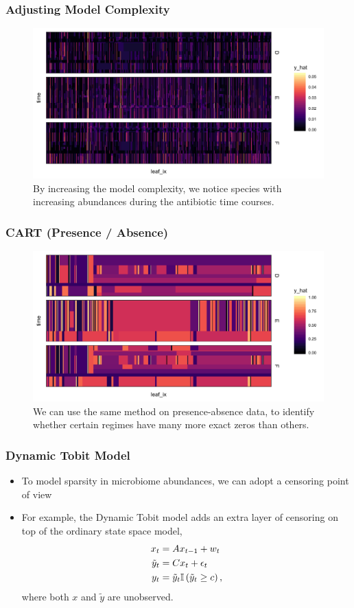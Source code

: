 \documentclass{beamer}
\begin{document}
\begin{frame}
  \frametitle{Adjusting Model Complexity}
  \begin{figure}[ht]
    \centering
    \includegraphics[width=.8\textwidth]{figure/rpart_simple}
    \caption{By increasing the model complexity, we notice species with
      increasing abundances during the antibiotic time
      courses. \label{fig:rpart_simple} }
  \end{figure}
\end{frame}


\begin{frame}
  \frametitle{CART (Presence / Absence)}
  \begin{figure}[ht]
    \centering
    \includegraphics[width=.8\textwidth]{figure/rpart_binary}
    \caption{We can use the same method on presence-absence data, to identify
      whether certain regimes have many more exact zeros than others.
      \label{fig:rpart_binary} }
  \end{figure}
\end{frame}


\begin{frame}
  \frametitle{Dynamic Tobit Model}
  \begin{itemize}
  \item To model sparsity in microbiome abundances, we can adopt a censoring
    point of view
  \item For example, the Dynamic Tobit model adds an extra layer of censoring on
    top of the ordinary state space model,
    \begin{align*}
      x_{t} &= Ax_{t - 1} + w_{t} \\
      \tilde{y}_{t} &= Cx_{t} + \epsilon_{t} \\
      y_{t} &= \tilde{y}_{t} \mathbb{I}\left({\tilde{y}_{t} \geq c}\right),
    \end{align*}
    where both $x$ and $\tilde{y}$ are unobserved.
  \end{itemize}
\end{frame}
\end{document}
